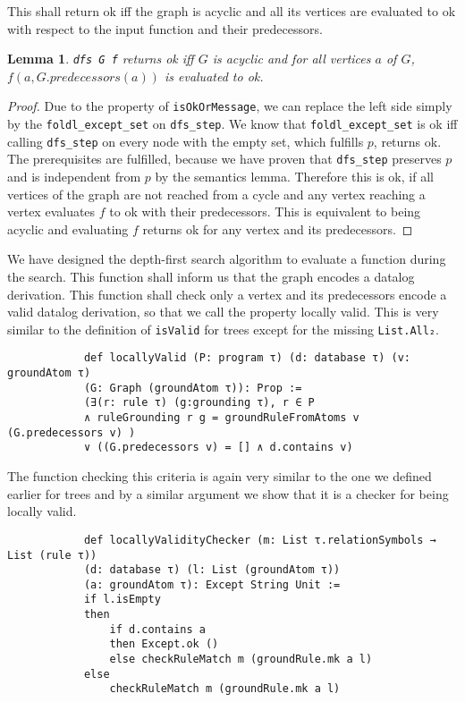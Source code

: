 \documentclass{article}
\newtheorem{lemma}{Lemma}
\begin{document}
        This shall return ok iff the graph is acyclic and all its vertices are evaluated to ok with respect to the input function and their predecessors.

        \begin{lemma}
            \texttt{dfs G f} returns ok iff $G$ is acyclic and for all vertices $a$ of $G$, $f(a, G.predecessors(a))$ is evaluated to ok.
        \end{lemma}
        \begin{proof}
            Due to the property of \texttt{isOkOrMessage}, we can replace the left side simply by the \texttt{foldl\_except\_set} on \texttt{dfs\_step}. We know that \texttt{foldl\_except\_set} is ok iff calling \texttt{dfs\_step} on every node with the empty set, which fulfills $p$, returns ok. The prerequisites are fulfilled, because we have proven that \texttt{dfs\_step} preserves $p$ and is independent from $p$ by the semantics lemma. Therefore this is ok, if all vertices of the graph are not reached from a cycle and any vertex reaching a vertex evaluates $f$ to ok with their predecessors. This is equivalent to being acyclic and evaluating $f$ returns ok for any vertex and its predecessors.
        \end{proof}

        We have designed the depth-first search algorithm to evaluate a function during the search. This function shall inform us that the graph encodes a datalog derivation. This function shall check only a vertex and its predecessors encode a valid datalog derivation, so that we call the property locally valid. This is very similar to the definition of \texttt{isValid} for trees except for the missing \texttt{List.All₂}.

        \begin{lstlisting}
            def locallyValid (P: program τ) (d: database τ) (v: groundAtom τ) 
            (G: Graph (groundAtom τ)): Prop :=
            (∃(r: rule τ) (g:grounding τ), r ∈ P 
            ∧ ruleGrounding r g = groundRuleFromAtoms v (G.predecessors v) ) 
            ∨ ((G.predecessors v) = [] ∧ d.contains v)
        \end{lstlisting}

        The function checking this criteria is again very similar to the one we defined earlier for trees and by a similar argument we show that it is a checker for being locally valid.

        \begin{lstlisting}
            def locallyValidityChecker (m: List τ.relationSymbols → List (rule τ))
            (d: database τ) (l: List (groundAtom τ))
            (a: groundAtom τ): Except String Unit :=
            if l.isEmpty
            then
                if d.contains a
                then Except.ok ()
                else checkRuleMatch m (groundRule.mk a l) 
            else
                checkRuleMatch m (groundRule.mk a l)
        \end{lstlisting}
\end{document}
